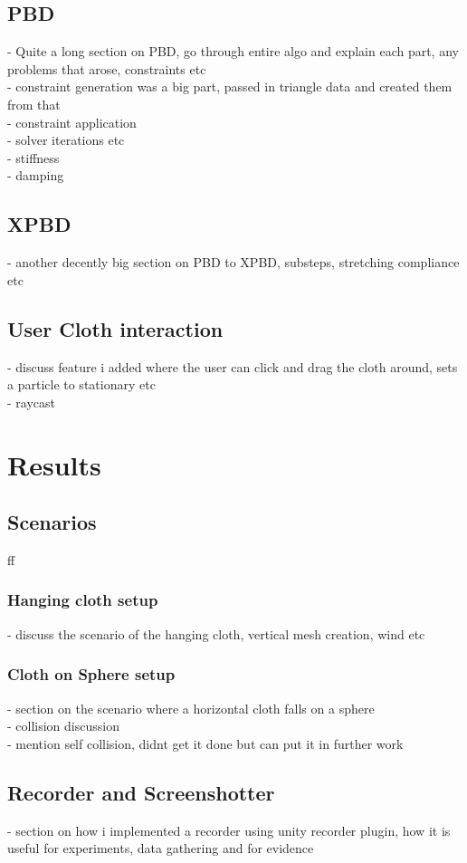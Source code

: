 \documentclass[12pt,a4paper]{article}
\begin{document}
\subsection{PBD}
- Quite a long section on PBD, go through entire algo and explain each part, any problems that arose, constraints etc\\
- constraint generation was a big part, passed in triangle data and created them from that\\
- constraint application\\
- solver iterations etc\\
- stiffness\\
- damping\\
\subsection{XPBD}
- another decently big section on PBD to XPBD, substeps, stretching compliance etc

\subsection{User Cloth interaction}
- discuss feature i added where the user can click and drag the cloth around, sets a particle to stationary etc\\
- raycast


\section{Results}

\subsection{Scenarios}
ff
\subsubsection{Hanging cloth setup}
- discuss the scenario of the hanging cloth, vertical mesh creation, wind etc
\subsubsection{Cloth on Sphere setup}
- section on the scenario where a horizontal cloth falls on a sphere\\
- collision discussion\\
- mention self collision, didnt get it done but can put it in further work

\subsection{Recorder and Screenshotter}
- section on how i implemented a recorder using unity recorder plugin, how it is useful for experiments, data gathering and for evidence
\end{document}
